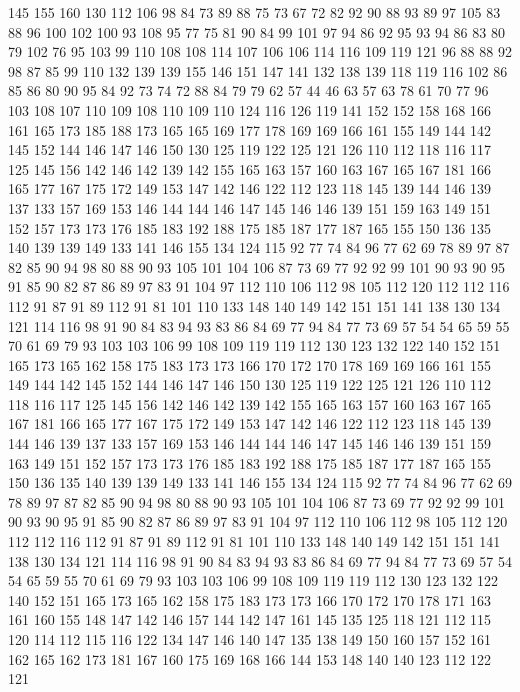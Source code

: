 145 155 160 130 112 106 98 84 73 89 88 75 73 67 72 82 92 90 88 93
89 97 105 83 88 96 100 102 100 93 108 95 77 75 81 90 84 99 101 97
94 86 92 95 93 94 86 83 80 79 102 76 95 103 99 110 108 108 114 107
106 106 114 116 109 119 121 96 88 88 92 98 87 85 99 110 132 139 139 155
146 151 147 141 132 138 139 118 119 116 102 86 85 86 80 90 95 84 92 73
74 72 88 84 79 79 62 57 44 46 63 57 63 78 61 70 77 96 103 108
107 110 109 108 110 109 110 124 116 126 119 141 152 152 158 168 166 161 165 173
185 188 173 165 165 169 177 178 169 169 166 161 155 149 144 142 145 152 144 146
147 146 150 130 125 119 122 125 121 126 110 112 118 116 117 125 145 156 142 146
142 139 142 155 165 163 157 160 163 167 165 167 181 166 165 177 167 175 172 149
153 147 142 146 122 112 123 118 145 139 144 146 139 137 133 157 169 153 146 144
144 146 147 145 146 146 139 151 159 163 149 151 152 157 173 173 176 185 183 192
188 175 185 187 177 187 165 155 150 136 135 140 139 139 149 133 141 146 155 134
124 115 92 77 74 84 96 77 62 69 78 89 97 87 82 85 90 94 98 80
88 90 93 105 101 104 106 87 73 69 77 92 92 99 101 90 93 90 95 91
85 90 82 87 86 89 97 83 91 104 97 112 110 106 112 98 105 112 120 112
112 116 112 91 87 91 89 112 91 81 101 110 133 148 140 149 142 151 151 141
138 130 134 121 114 116 98 91 90 84 83 94 93 83 86 84 69 77 94 84
77 73 69 57 54 54 65 59 55 70 61 69 79 93 103 103 106 99 108 109
119 119 112 130 123 132 122 140 152 151 165 173 165 162 158 175 183 173 173 166
170 172 170 178 169 169 166 161 155 149 144 142 145 152 144 146 147 146 150 130
125 119 122 125 121 126 110 112 118 116 117 125 145 156 142 146 142 139 142 155
165 163 157 160 163 167 165 167 181 166 165 177 167 175 172 149 153 147 142 146
122 112 123 118 145 139 144 146 139 137 133 157 169 153 146 144 144 146 147 145
146 146 139 151 159 163 149 151 152 157 173 173 176 185 183 192 188 175 185 187
177 187 165 155 150 136 135 140 139 139 149 133 141 146 155 134 124 115 92 77
74 84 96 77 62 69 78 89 97 87 82 85 90 94 98 80 88 90 93 105
101 104 106 87 73 69 77 92 92 99 101 90 93 90 95 91 85 90 82 87
86 89 97 83 91 104 97 112 110 106 112 98 105 112 120 112 112 116 112 91
87 91 89 112 91 81 101 110 133 148 140 149 142 151 151 141 138 130 134 121
114 116 98 91 90 84 83 94 93 83 86 84 69 77 94 84 77 73 69 57
54 54 65 59 55 70 61 69 79 93 103 103 106 99 108 109 119 119 112 130
123 132 122 140 152 151 165 173 165 162 158 175 183 173 173 166 170 172 170 178
171 163 161 160 155 148 147 142 146 157 144 142 147 161 145 135 125 118 121 112
115 120 114 112 115 116 122 134 147 146 140 147 135 138 149 150 160 157 152 161
162 165 162 173 181 167 160 175 169 168 166 144 153 148 140 140 123 112 122 121
